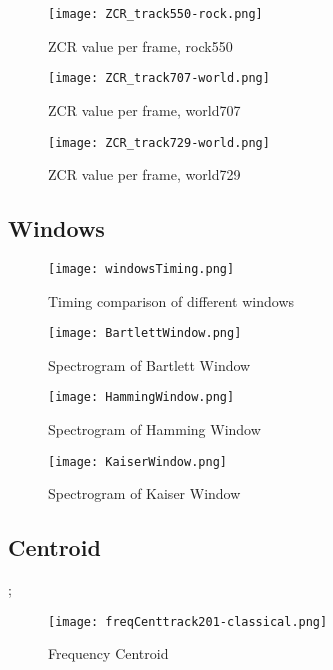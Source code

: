 \documentclass{article} %
\begin{document}
\begin{figure}
\centering
\texttt{[image: ZCR\_track550-rock.png]}
\caption{ZCR value per frame, rock550}
\label{fig:ZCR_550}
\end{figure}


\begin{figure}
\centering
\texttt{[image: ZCR\_track707-world.png]}
\caption{ZCR value per frame, world707}
\label{fig:ZCR_707}
\end{figure}


\begin{figure}[h!]
\centering
\texttt{[image: ZCR\_track729-world.png]}
\caption{ZCR value per frame, world729}
\label{fig:ZCR_729}
\end{figure}

\clearpage
\subsection{Windows}

\begin{figure}[ht!]
\centering
\texttt{[image: windowsTiming.png]}
\caption{Timing comparison of different windows}
\label{fig:windowsTimings}
\end{figure}


\begin{figure}[H]
\centering
\texttt{[image: BartlettWindow.png]}
\caption{Spectrogram of Bartlett Window}
\label{fig:bartWindows}
\end{figure}


\begin{figure}[H]
\centering
\texttt{[image: HammingWindow.png]}
\caption{Spectrogram of Hamming Window}
\label{fig:hamWindows}
\end{figure}

\begin{figure}[H]
\centering
\texttt{[image: KaiserWindow.png]}
\caption{Spectrogram of Kaiser Window}
\label{fig:kaiserWindows}
\end{figure}

\clearpage
\subsection{Centroid}
\label{sec:centroid};

\begin{figure}[H]
\centering
\texttt{[image: freqCenttrack201-classical.png]}
\caption{Frequency Centroid}
\label{fig:centr201}
\end{figure}
\end{document}
